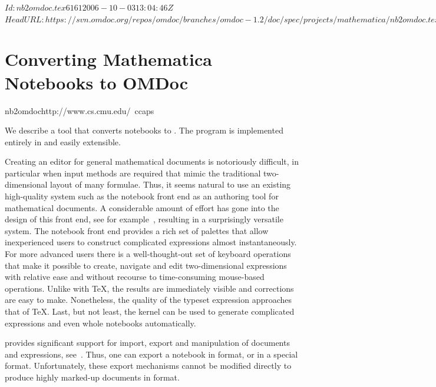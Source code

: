 \svnInfo $Id: nb2omdoc.tex 6161 2006-10-03 13:04:46Z  $
\svnKeyword $HeadURL: https://svn.omdoc.org/repos/omdoc/branches/omdoc-1.2/doc/spec/projects/mathematica/nb2omdoc.tex $
\def\nb2om{\scsys{nb2omdoc}}

\section{Converting Mathematica Notebooks to OMDoc}
\begin{project}{nb2omdoc}{http://www.cs.cmu.edu/~ccaps}
\end{project}

We describe a tool that converts {\mathematica} notebooks to {\omdoc}.  The program is
implemented entirely in {\mathematica} and easily extensible.

Creating an editor for general mathematical documents is notoriously difficult, in
particular when input methods are required that mimic the traditional two-dimensional
layout of many formulae.  Thus, it seems natural to use an existing high-quality system
such as the {\mathematica} notebook front end as an authoring tool for mathematical
documents.  A considerable amount of effort has gone into the design of this front end, see
for example~\cite{Wolfram00:mathnotation}, resulting in a surprisingly versatile system.
The notebook front end provides a rich set of palettes that allow inexperienced users to
construct complicated expressions almost instantaneously.  For more advanced users there
is a well-thought-out set of keyboard operations that make it possible to create, navigate
and edit two-dimensional expressions with relative ease and without recourse to
time-consuming mouse-based operations.  Unlike with {\TeX}, the results are immediately
visible and corrections are easy to make.  Nonetheless, the quality of the typeset
expression approaches that of {\TeX}.  Last, but not least, the {\mathematica} kernel can
be used to generate complicated expressions and even whole notebooks automatically.

{\mathematica} provides significant support for import, export and manipulation of {\xml}
documents and expressions, see~\cite{Wolfram.02}.  Thus, one can export a notebook in
{\mathml} format, or in a special {} format.  Unfortunately, these
export mechanisms cannot be modified directly to produce highly marked-up documents in
{\omdoc} format.

